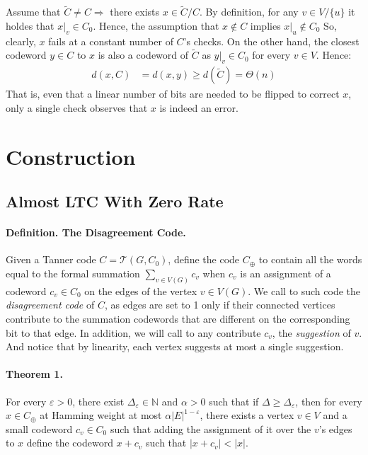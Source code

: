 \documentclass{article}
\newcommand{ \Tann } {  \mathcal{T}\left( G, C_0 \right) }
\begin{document}
\begin{multicols*}{2}
Assume that $\tilde{C} \neq C \Rightarrow$ there exists $x\in \tilde{C} / C$. By definition, for any $v\in V / \{u\}$ it holdes that $x|_{v} \in C_{0}$. Hence, the assumption that $ x \notin C$  implies $x|_{u} \notin C_{0}$ So, clearly, $x$ fails at a constant number of $C$'s checks. On the other hand, the closest codeword $y \in C$ to $x$ is also a codeword of $\tilde{C}$ as $y|_{v} \in C_{0}$ for every $v\in V$.  Hence:
\begin{equation*}
  \begin{split}
    d\left( x,C \right) &= d\left( x,y \right) \ge d\left( \tilde{C} \right) =\Theta\left( n \right)
  \end{split}
\end{equation*}
That is, even that a linear number of bits are needed to be flipped to correct $x$, only a single check observes that $x$ is indeed an error.
  \section{Construction}
\subsection{ Almost LTC With Zero Rate}
\paragraph{Definition. The Disagreement Code.} Given a Tanner code $C = \Tann$, define the code $C_{\oplus}$ to contain all the words equal to the formal summation $ \sum_{v \in V\left( G \right)} {c_{v} }$ when $c_{v}$ is an assignment of a codeword $ c_{v} \in C_0 $  on the edges of the vertex $ v \in V\left( G \right)$.
We call to such code the \textit{disagreement code} of $C$, as edges are set to 1 only if their connected vertices contribute to the summation codewords that are different on the corresponding bit to that edge. In addition, we will call to any contribute $c_v$, the \textit{suggestion} of $v$. And notice that by linearity, each vertex suggests at most a single suggestion.   
 
\paragraph{Theorem 1.} For every $\varepsilon > 0$, there exist $\Delta_{\varepsilon}\in \mathbb{N}$ and $\alpha>0$ such that if $\Delta \ge \Delta_{\varepsilon}$, then for every $x \in C_{\oplus}$ at Hamming weight at most $\alpha |E|^{1-\varepsilon}$, there exists a vertex $v \in V$ and a small codeword $c_{v} \in C_{0} $ such that adding the assignment of it over the $v$'s edges to $x$ define the codeword $x + c_{v}$  such that $|x + c_{v}| < |x|$.  


\end{multicols*}
\end{document}
